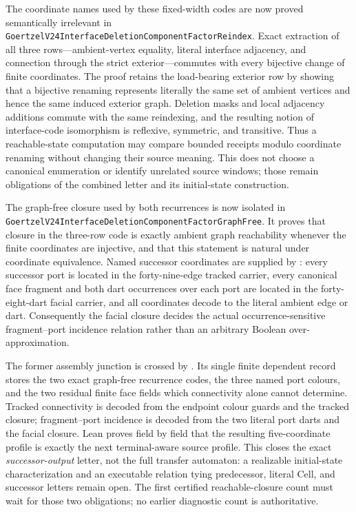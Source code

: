 \documentclass[11pt]{article}
\theoremstyle{definition}
\begin{document}
The coordinate names used by these fixed-width codes are now proved
semantically irrelevant in
\texttt{GoertzelV24InterfaceDeletionComponentFactorReindex}.  Exact extraction
of all three rows---ambient-vertex equality, literal interface adjacency, and
connection through the strict exterior---commutes with every bijective change
of finite coordinates.  The proof retains the load-bearing exterior row by
showing that a bijective renaming represents literally the same set of ambient
vertices and hence the same induced exterior graph.  Deletion masks and local
adjacency additions commute with the same reindexing, and the resulting notion
of interface-code isomorphism is reflexive, symmetric, and transitive.  Thus a
reachable-state computation may compare bounded receipts modulo coordinate
renaming without changing their source meaning.  This does not choose a
canonical enumeration or identify unrelated source windows; those remain
obligations of the combined letter and its initial-state construction.

The graph-free closure used by both recurrences is now isolated in
\texttt{GoertzelV24InterfaceDeletionComponentFactorGraphFree}.  It proves that
closure in the three-row code is exactly ambient graph reachability whenever
the finite coordinates are injective, and that this statement is natural
under coordinate equivalence.  Named successor coordinates are supplied by
:
every successor port is located in the forty-nine-edge tracked carrier, every
canonical face fragment and both dart occurrences over each port are located
in the forty-eight-dart facial carrier, and all coordinates decode to the
literal ambient edge or dart.  Consequently the facial closure decides the
actual occurrence-sensitive fragment--port incidence relation rather than an
arbitrary Boolean over-approximation.

The former assembly junction is crossed by
.  Its
single finite dependent record stores the two exact graph-free recurrence
codes, the three named port colours, and the two residual finite face fields
which connectivity alone cannot determine.  Tracked connectivity is decoded
from the endpoint colour guards and the tracked closure; fragment--port
incidence is decoded from the two literal port darts and the facial closure.
Lean proves field by field that the resulting five-coordinate profile is
exactly the next terminal-aware source profile.  This closes the exact
\emph{successor-output} letter, not the full transfer automaton: a realizable
initial-state characterization and an executable relation tying predecessor,
literal Cell, and successor letters remain open.  The first certified
reachable-closure count must wait for those two obligations; no earlier
diagnostic count is authoritative.
\end{document}
